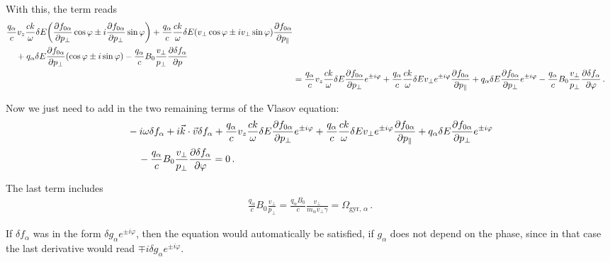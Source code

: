 \documentclass[main.tex]{subfiles}
\begin{document}
With this, the term reads 
%
\begin{align}
\begin{split}
& \frac{q_\alpha }{c} v_z \frac{ck}{\omega } \delta E \qty(
    \pdv{f_{0 \alpha }}{p_\perp} \cos \varphi 
    \pm i \pdv{f_{0 \alpha }}{p_\perp} \sin \varphi 
)
+ \frac{q_\alpha}{c} \frac{ck}{\omega } \delta E
\qty(v_\perp \cos \varphi \pm i v_\perp \sin \varphi )
\pdv{f_{0 \alpha }}{p_\parallel} 
\\
&\phantom{=}\ 
+ q_\alpha \delta E \pdv{f_{0 \alpha }}{p_\perp} \qty(\cos \varphi \pm i \sin \varphi )  
- \frac{q_\alpha}{c} B_0 \frac{v_\perp}{p_\perp} \pdv{ \delta f_\alpha }{p}
\end{split}  \\
&= \frac{q_\alpha }{c} v_z \frac{ck}{\omega } \delta E 
    \pdv{f_{0 \alpha }}{p_\perp} e^{\pm i \varphi }
+ \frac{q_\alpha}{c} \frac{ck}{\omega } \delta E
v_\perp e^{\pm i \varphi }
\pdv{f_{0 \alpha }}{p_\parallel} 
+ q_\alpha \delta E \pdv{f_{0 \alpha }}{p_\perp} e^{\pm i \varphi } 
- \frac{q_\alpha}{c} B_0 \frac{v_\perp}{p_\perp} \pdv{ \delta f_\alpha }{\varphi }
\,.
\end{align}

Now we just need to add in the two remaining terms of the Vlasov equation: 
%
\begin{align}
\begin{split}
&
- i \omega \delta f_\alpha 
+ i \vec{k} \cdot \vec{v} \delta f_\alpha + 
\frac{q_\alpha }{c} v_z \frac{ck}{\omega } \delta E 
    \pdv{f_{0 \alpha }}{p_\perp} e^{\pm i \varphi }
+ \frac{q_\alpha}{c} \frac{ck}{\omega } \delta E
v_\perp e^{\pm i \varphi }
\pdv{f_{0 \alpha }}{p_\parallel} 
+ q_\alpha \delta E \pdv{f_{0 \alpha }}{p_\perp} e^{\pm i \varphi } 
\\
&\phantom{=}\ 
- \frac{q_\alpha}{c} B_0 \frac{v_\perp}{p_\perp} \pdv{ \delta f_\alpha }{\varphi } = 0
\,.
\end{split}
\end{align}

The last term includes
%
\begin{align}
\frac{q_\alpha}{c} B_0 \frac{v_\perp}{p_\perp} = \frac{q_\alpha B_0 }{c} \frac{v_\perp}{m_\alpha v_\perp \gamma } = \Omega _{\text{gyr, }\alpha }
\,.
\end{align}

If \(\delta f_\alpha \) was in the form \(\delta g_\alpha e^{\pm i \varphi }\), then the equation would automatically be satisfied, if \(g_\alpha \) does not depend on the phase, since in that case the last derivative would read \(\mp i \delta g_\alpha e^{\pm i \varphi }\). 
\end{document}
